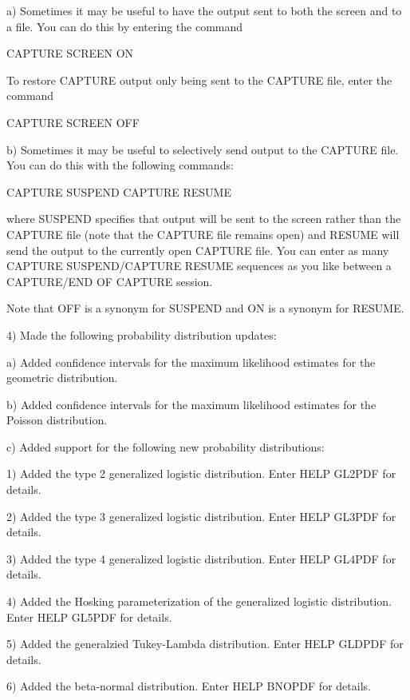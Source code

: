 {    a) Sometimes it may be useful to have the output sent to
       both the screen and to a file.  You can do this by
       entering the command

          CAPTURE SCREEN ON

       To restore CAPTURE output only being sent to the
       CAPTURE file, enter the command

          CAPTURE SCREEN OFF

    b) Sometimes it may be useful to selectively send output to
       the CAPTURE file.  You can do this with the following
       commands:

          CAPTURE SUSPEND
          CAPTURE RESUME

      where SUSPEND specifies that output will be sent to the
      screen rather than the CAPTURE file (note that the CAPTURE
      file remains open) and RESUME will send the output to
      the currently open CAPTURE file.  You can enter as many
      CAPTURE SUSPEND/CAPTURE RESUME sequences as you like
      between a CAPTURE/END OF CAPTURE session.

      Note that OFF is a synonym for SUSPEND and ON is a
      synonym for RESUME.

 4) Made the following probability distribution updates:

    a) Added confidence intervals for the maximum likelihood
       estimates for the geometric distribution.

    b) Added confidence intervals for the maximum likelihood
       estimates for the Poisson distribution.

    c) Added support for the following new probability
       distributions:

       1) Added the type 2 generalized logistic distribution.
          Enter HELP GL2PDF for details.

       2) Added the type 3 generalized logistic distribution.
          Enter HELP GL3PDF for details.

       3) Added the type 4 generalized logistic distribution.
          Enter HELP GL4PDF for details.

       4) Added the Hosking parameterization of the generalized
          logistic distribution.  Enter HELP GL5PDF for details.

       5) Added the generalzied Tukey-Lambda distribution.  Enter
          HELP GLDPDF for details.

       6) Added the beta-normal distribution.  Enter HELP BNOPDF
          for details.

}

